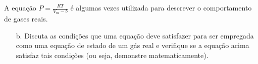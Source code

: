 \begin{xcs}
    A equação \( P = \frac{RT}{V_m - b} \) é algumas vezes utilizada para
    descrever o comportamento de gases reais. 
    \begin{enumerate}[label=\alph*.]
        \item[b.] Discuta as condições que uma equação deve satisfazer para ser
            empregada como uma equação de estado de um gás real e verifique se a
            equação acima satisfaz tais condições (ou seja, demonstre
            matematicamente). 
    \end{enumerate}
\end{xcs}
\begin{rsl}
    
\end{rsl}
